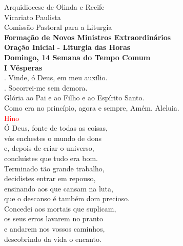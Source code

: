 \documentclass{book}
\begin{document}
\pagestyle{empty}
\begin{center}
    Arquidiocese de Olinda e Recife \\
    Vicariato Paulista \\
    Comissão Pastoral para a Liturgia
    \vspace{.2cm} \\
    \textbf{Formação de Novos Ministros Extraordinários}
    \vspace{.2cm} \\
    \textbf{Oração Inicial - Liturgia das Horas}
    \vspace{.2cm} \\
    \textbf{Domingo, 14\textordfeminine{} Semana do Tempo Comum}
    \vspace{.2cm} \\
    \textbf{I Vésperas}
    \vspace{.2cm} \\
    {\color{red} \Vbar.} Vinde, ó Deus, em meu auxílio. \\
    {\color{red} \Rbar.} Socorrei-me sem demora. \\
    Glória ao Pai e ao Filho e ao Espírito Santo. \\
    Como era no princípio, agora e sempre, Amém. Aleluia.
    \vspace{.2cm} \\
    \textcolor{red}{Hino}
    \vspace{.2cm} \\
    Ó Deus, fonte de todas as coisas, \\
    vós enchestes o mundo de dons \\
    e, depois de criar o universo, \\
    concluístes que tudo era bom.
    \vspace{.2cm} \\
    Terminado tão grande trabalho, \\
    decidistes entrar em repouso, \\
    ensinando aos que cansam na luta, \\
    que o descanso é também dom precioso.
    \vspace{.2cm} \\
    Concedei aos mortais que suplicam, \\
    os seus erros lavarem no pranto \\
    e andarem nos vossos caminhos, \\
    descobrindo da vida o encanto.
    \vspace{.2cm} \\

\end{center}
\end{document}
